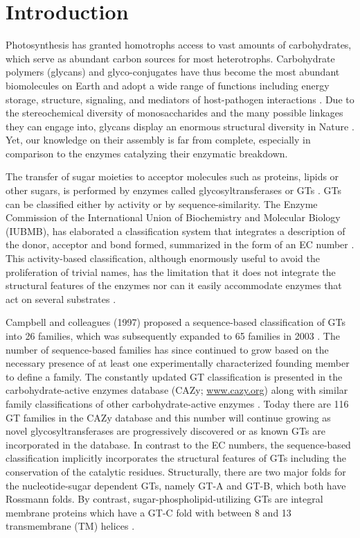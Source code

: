 \documentclass{article}
\begin{document}
\section{Introduction}

Photosynthesis has granted homotrophs access to vast amounts of carbohydrates, which serve as abundant carbon sources for most heterotrophs. Carbohydrate polymers (glycans) and glyco-conjugates have thus become the most abundant biomolecules on Earth and adopt a wide range of functions including energy storage, structure, signaling, and mediators of host-pathogen interactions \cite{varki_essentials_2022}. Due to the stereochemical diversity of monosaccharides and the many possible linkages they can engage into, glycans display an enormous structural diversity in Nature \cite{laine_calculation_1994,lapebie_bacteroidetes_2019}. Yet, our knowledge on their assembly is far from complete, especially in comparison to the enzymes catalyzing their enzymatic breakdown. 
 
The transfer of sugar moieties to acceptor molecules such as proteins, lipids or other sugars, is performed by enzymes called glycosyltransferases or GTs \cite{lairson_glycosyltransferases_2008}. GTs can be classified either by activity or by sequence-similarity. The Enzyme Commission of the International Union of Biochemistry and Molecular Biology (IUBMB), has elaborated a classification system that integrates a description of the donor, acceptor and bond formed, summarized in the form of an EC number \cite{mcdonald_fifty-five_2014}. This activity-based classification, although enormously useful to avoid the proliferation of trivial names, has the limitation that it does not integrate the structural features of the enzymes nor can it easily accommodate enzymes that act on several substrates \cite{mcdonald_fifty-five_2014}. 

Campbell and colleagues (1997) proposed a sequence-based classification of GTs into 26 families, which was subsequently expanded to 65 families in 2003 \cite{coutinho_evolving_2003}. The number of sequence-based families has since continued to grow based on the necessary presence of at least one experimentally characterized founding member to define a family. The constantly updated GT classification is presented in the carbohydrate-active enzymes database (CAZy; \url{www.cazy.org}) along with similar family classifications of other carbohydrate-active enzymes \cite{drula_carbohydrate-active_2022}. Today there are 116 GT families in the CAZy database and this number will continue growing as novel glycosyltransferases are progressively discovered or as known GTs are incorporated in the database. In contrast to the EC numbers, the sequence-based classification implicitly incorporates the structural features of GTs including the conservation of the catalytic residues. Structurally, there are two major folds for the nucleotide-sugar dependent GTs, namely GT-A and GT-B, which both have Rossmann folds. By contrast, sugar-phospholipid-utilizing GTs are integral membrane proteins which have a GT-C fold with between 8 and 13 transmembrane (TM) helices \cite{lairson_glycosyltransferases_2008}.
\end{document}
